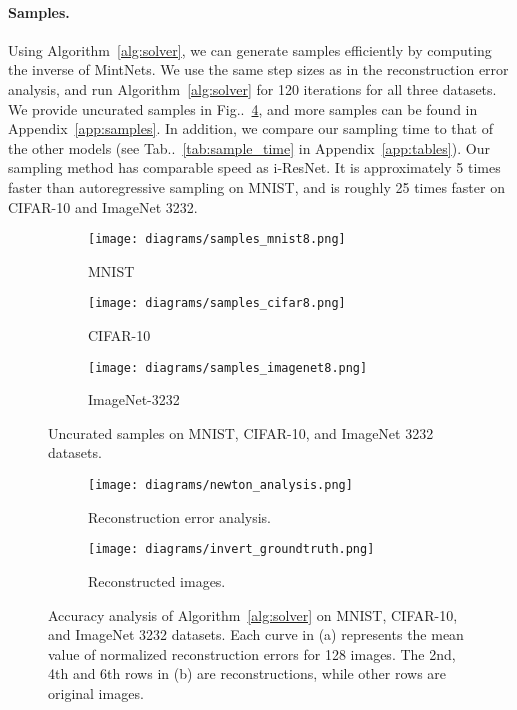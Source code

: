 \documentclass{article}
\makeatletter
\def\@onedot{\ifx\@let@token.\else.\null\fi\xspace}
\DeclareRobustCommand\onedot{\futurelet\@let@token\@onedot}
\newcommand{\figref}[1]{Fig\onedot~\ref{#1}}
\newcommand{\algoref}[1]{Algorithm~\ref{#1}}
\newcommand{\tabref}[1]{Tab\onedot~\ref{#1}}
\makeatother
\begin{document}
\paragraph{Samples.} Using \algoref{alg:solver}, we can generate samples efficiently by computing the inverse of MintNets. We use the same step sizes as in the reconstruction error analysis, and run \algoref{alg:solver} for 120 iterations for all three datasets. We provide uncurated samples in \figref{fig:samples}, and more samples can be found in Appendix~\ref{app:samples}. In addition, we compare our sampling time to that of the other models (see \tabref{tab:sample_time} in Appendix~\ref{app:tables}). Our sampling method has comparable speed as i-ResNet. It is approximately 5 times faster than autoregressive sampling on MNIST, and is roughly 25 times faster on CIFAR-10 and ImageNet 3232.
\begin{figure}\centering
    \begin{subfigure}[b]{0.3\textwidth}
        \texttt{[image: diagrams/samples\_mnist8.png]}
        \caption{MNIST}
        \label{fig:mnist}
    \end{subfigure}
    \begin{subfigure}[b]{0.3\textwidth}
        \texttt{[image: diagrams/samples\_cifar8.png]}
        \caption{CIFAR-10}
        \label{fig:cifar10}
    \end{subfigure}
    \begin{subfigure}[b]{0.3\textwidth}
        \texttt{[image: diagrams/samples\_imagenet8.png]}
        \caption{ImageNet-3232}
        \label{fig:imagenet32}
    \end{subfigure}
    \caption{Uncurated samples on MNIST, CIFAR-10, and ImageNet 3232 datasets.}
    \label{fig:samples}
\end{figure}
\begin{figure}\centering
    \begin{subfigure}[b]{0.5\textwidth}
        \texttt{[image: diagrams/newton\_analysis.png]}
        \caption{Reconstruction error analysis.}
        \label{fig:newton}
    \end{subfigure}
    \begin{subfigure}[b]{0.45\textwidth}
        \texttt{[image: diagrams/invert\_groundtruth.png]}
        \caption{Reconstructed images.}
        \label{fig:recon}
    \end{subfigure}
    \caption{Accuracy analysis of \algoref{alg:solver} on MNIST, CIFAR-10, and ImageNet 3232 datasets. Each curve in (a) represents the mean value of normalized reconstruction errors for 128 images. The 2nd, 4th and 6th rows in (b) are reconstructions, while other rows are original images.}
    \label{fig:invert}
\end{figure}
\end{document}
